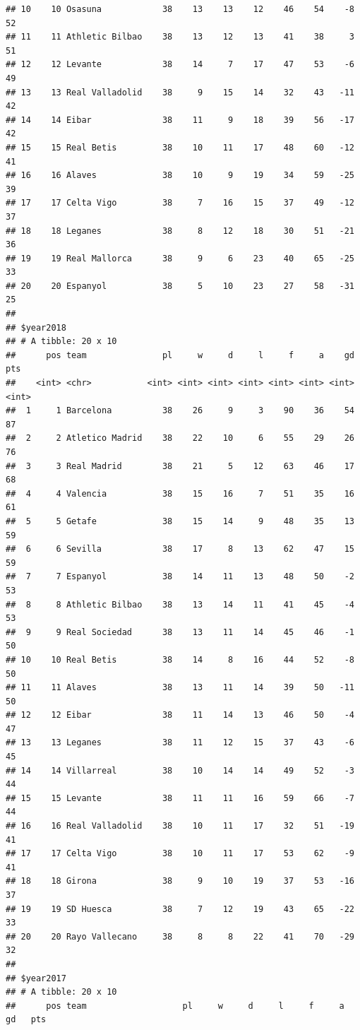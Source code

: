 \documentclass[]{tufte-handout}
\begin{document}
\begin{verbatim}
## 10    10 Osasuna            38    13    13    12    46    54    -8    52
## 11    11 Athletic Bilbao    38    13    12    13    41    38     3    51
## 12    12 Levante            38    14     7    17    47    53    -6    49
## 13    13 Real Valladolid    38     9    15    14    32    43   -11    42
## 14    14 Eibar              38    11     9    18    39    56   -17    42
## 15    15 Real Betis         38    10    11    17    48    60   -12    41
## 16    16 Alaves             38    10     9    19    34    59   -25    39
## 17    17 Celta Vigo         38     7    16    15    37    49   -12    37
## 18    18 Leganes            38     8    12    18    30    51   -21    36
## 19    19 Real Mallorca      38     9     6    23    40    65   -25    33
## 20    20 Espanyol           38     5    10    23    27    58   -31    25
## 
## $year2018
## # A tibble: 20 x 10
##      pos team               pl     w     d     l     f     a    gd   pts
##    <int> <chr>           <int> <int> <int> <int> <int> <int> <int> <int>
##  1     1 Barcelona          38    26     9     3    90    36    54    87
##  2     2 Atletico Madrid    38    22    10     6    55    29    26    76
##  3     3 Real Madrid        38    21     5    12    63    46    17    68
##  4     4 Valencia           38    15    16     7    51    35    16    61
##  5     5 Getafe             38    15    14     9    48    35    13    59
##  6     6 Sevilla            38    17     8    13    62    47    15    59
##  7     7 Espanyol           38    14    11    13    48    50    -2    53
##  8     8 Athletic Bilbao    38    13    14    11    41    45    -4    53
##  9     9 Real Sociedad      38    13    11    14    45    46    -1    50
## 10    10 Real Betis         38    14     8    16    44    52    -8    50
## 11    11 Alaves             38    13    11    14    39    50   -11    50
## 12    12 Eibar              38    11    14    13    46    50    -4    47
## 13    13 Leganes            38    11    12    15    37    43    -6    45
## 14    14 Villarreal         38    10    14    14    49    52    -3    44
## 15    15 Levante            38    11    11    16    59    66    -7    44
## 16    16 Real Valladolid    38    10    11    17    32    51   -19    41
## 17    17 Celta Vigo         38    10    11    17    53    62    -9    41
## 18    18 Girona             38     9    10    19    37    53   -16    37
## 19    19 SD Huesca          38     7    12    19    43    65   -22    33
## 20    20 Rayo Vallecano     38     8     8    22    41    70   -29    32
## 
## $year2017
## # A tibble: 20 x 10
##      pos team                   pl     w     d     l     f     a    gd   pts

\end{verbatim}
\end{document}
